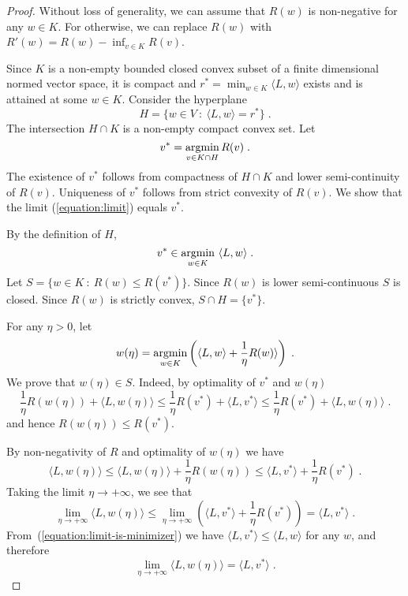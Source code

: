 \begin{proof}
Without loss of generality, we can assume that $R(w)$ is non-negative for any
$w \in K$.  For otherwise, we can replace $R(w)$ with $R'(w) = R(w) - \inf_{v
\in K} R(v)$.

Since $K$ is a non-empty bounded closed convex subset of a finite dimensional
normed vector space, it is compact and $r^* = \min_{w \in K} \langle L, w
\rangle$ exists and is attained at some $w \in K$. Consider the hyperplane
$$
H = \{ w \in V ~:~ \langle L, w \rangle = r^* \} \; .
$$
The intersection $H \cap K$ is a non-empty compact convex set.
Let
$$
v^* = \operatorname*{argmin}_{v \in K \cap H} R(v) \; .
$$
The existence of $v^*$ follows from compactness of $H \cap K$ and lower
semi-continuity of $R(v)$.  Uniqueness of $v^*$ follows from strict convexity
of $R(v)$. We show that the limit (\ref{equation:limit}) equals $v^*$.

By the definition of $H$,
\begin{equation}
\label{equation:limit-is-minimizer}
v^* \in \operatorname*{argmin}_{w \in K} \ \langle L, w \rangle \; .
\end{equation}
Let $S = \{ w \in K ~:~ R(w) \le R(v^*) \}$. Since $R(w)$ is lower
semi-continuous $S$ is closed. Since $R(w)$ is strictly convex, $S \cap H =
\{v^*\}$.

For any $\eta > 0$, let
$$
w(\eta) = \operatorname*{argmin}_{w \in K} \left( \langle L, w \rangle + \frac{1}{\eta} R(w) \rangle \right) \; .
$$
We prove that $w(\eta) \in S$. Indeed, by optimality of $v^*$ and $w(\eta)$
$$
\frac{1}{\eta} R(w(\eta))  + \langle L, w(\eta) \rangle
\le
\frac{1}{\eta} R(v^*)  + \langle L, v^* \rangle
\le
\frac{1}{\eta} R(v^*)  + \langle L, w(\eta) \rangle \; .
$$
and hence $R(w(\eta)) \le R(v^*)$.

By non-negativity of $R$ and optimality of $w(\eta)$ we have
$$
\langle L, w(\eta) \rangle
\le \langle L, w(\eta) \rangle + \frac{1}{\eta} R(w(\eta))
\le \langle L, v^* \rangle + \frac{1}{\eta} R(v^*) \; .
$$
Taking the limit $\eta \to +\infty$, we see that
$$
\lim_{\eta \to +\infty} \langle L, w(\eta) \rangle
\le\lim_{\eta \to +\infty} \left( \langle L, v^* \rangle + \frac{1}{\eta} R(v^*) \right)
= \langle L, v^* \rangle \; .
$$
From~(\ref{equation:limit-is-minimizer}) we have
$\langle L, v^* \rangle \le \langle L, w \rangle$ for any $w$, and therefore
\begin{equation}
\label{equation:limit-equality}
\lim_{\eta \to +\infty} \langle L, w(\eta) \rangle = \langle L, v^* \rangle \; .
\end{equation}


\end{proof}
